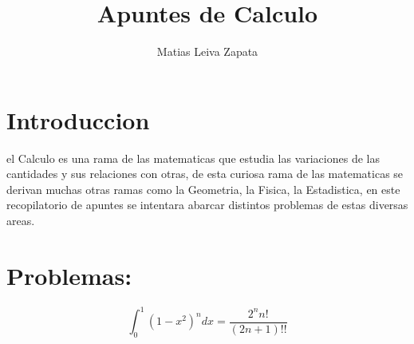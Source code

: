 \documentclass{article}
\title{\textbf{Apuntes de Calculo}}
\author{Matias Leiva Zapata}
\theoremstyle{mytheoremstyle}
\theoremstyle{mytheoremstyle}
\theoremstyle{myproblemstyle}
\begin{document}
\maketitle

\section{Introduccion}
el Calculo es una rama de las matematicas que estudia las variaciones de las cantidades y sus relaciones con otras,
de esta curiosa rama de las matematicas se derivan muchas otras ramas como la Geometria, la Fisica, la Estadistica,
en este recopilatorio de apuntes se intentara abarcar distintos problemas de estas diversas areas.

\section{Problemas:}


\begin{problem}


\[\int_{0}^{1}(1-x^2)^n dx = \frac{2^{n}{n!}}{(2n+1)!!}\]

\end{problem}
\end{document}
